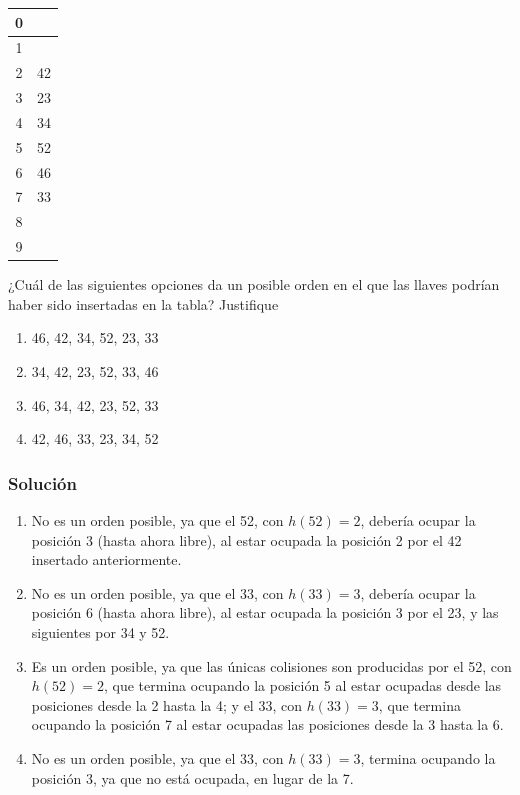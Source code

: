 \documentclass{article}
\begin{document}
\begin{center}
\begin{tabular}{|c|c|}
    \hline
    0 &    \\ \hline
    1 &    \\ \hline
    2 & 42 \\ \hline
    3 & 23 \\ \hline
    4 & 34 \\ \hline
    5 & 52 \\ \hline
    6 & 46 \\ \hline
    7 & 33 \\ \hline
    8 &    \\ \hline
    9 &    \\ \hline
\end{tabular}
\end{center}

¿Cuál de las siguientes opciones da un posible orden en el que las llaves podrían haber sido
insertadas en la tabla? Justifique
\begin{enumerate}[label=(\Alph*), ref=\Alph*]
    \item 46, 42, 34, 52, 23, 33
    \item 34, 42, 23, 52, 33, 46
    \item 46, 34, 42, 23, 52, 33
    \item 42, 46, 33, 23, 34, 52
\end{enumerate}
\subsubsection*{Solución}
\begin{enumerate}[label=(\Alph*), ref=\Alph*]
    \item No es un orden posible, ya que el 52, con $h(52) = 2$, debería ocupar la posición 3 (hasta ahora libre), al estar ocupada la posición 2 por el 42 insertado anteriormente.
    \item No es un orden posible, ya que el 33, con $h(33) = 3$, debería ocupar la posición 6 (hasta ahora libre), al estar ocupada la posición 3 por el 23, y las siguientes por 34 y 52.
    \item Es un orden posible, ya que las únicas colisiones son producidas por el 52, con $h(52) = 2$, que termina ocupando la posición 5 al estar ocupadas desde las posiciones desde la 2 hasta la 4; y el 33, con $h(33) = 3$, que termina ocupando la posición 7 al estar ocupadas las posiciones desde la 3 hasta la 6.
    \item No es un orden posible, ya que el 33, con $h(33) = 3$, termina ocupando la posición 3, ya que no está ocupada, en lugar de la 7.
\end{enumerate}
\end{document}
